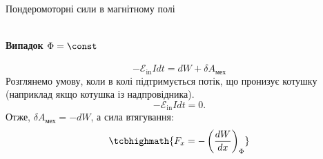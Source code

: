 \documentclass[onlytextwidth]{beamer}
\begin{document}
\begin{frame}{Пондеромоторні сили в магнітному полі}{}
\begin{overprint}
\begin{equation*}
		\end{equation*}
		\framesubtitle<3>{Випадок $\Phi = \const$}
		\begin{equation*}
			-\mathcal{E}_\text{in} I dt = dW + \delta A_\text{мех}
		\end{equation*}
		Розглянемо умову, коли в колі підтримується потік, що пронизує котушку (наприклад якщо котушка із надпровідника).
		\begin{equation*}
			- \mathcal{E}_\text{in} I dt = 0.
		\end{equation*}
		Отже, $\delta A_\text{мех} = - dW$, а сила втягування:
		\begin{equation*}
			\tcbhighmath{F_x = - \left( \frac{dW}{dx} \right)_{\Phi}}
		\end{equation*}
	\end{overprint}
\end{frame}
\end{document}
